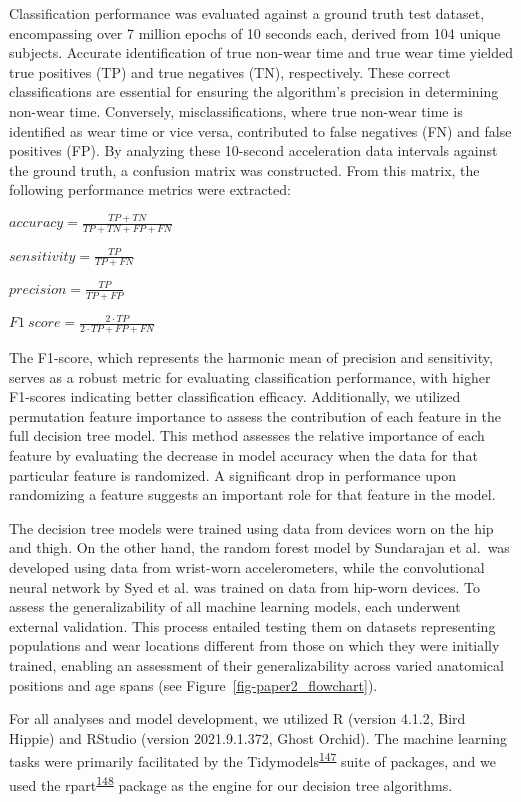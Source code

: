 \documentclass[
  10pt,
]{scrbook}
\begin{document}
Classification performance was evaluated against a ground truth test
dataset, encompassing over 7 million epochs of 10 seconds each, derived
from 104 unique subjects. Accurate identification of true non-wear time
and true wear time yielded true positives (TP) and true negatives (TN),
respectively. These correct classifications are essential for ensuring
the algorithm's precision in determining non-wear time. Conversely,
misclassifications, where true non-wear time is identified as wear time
or vice versa, contributed to false negatives (FN) and false positives
(FP). By analyzing these 10-second acceleration data intervals against
the ground truth, a confusion matrix was constructed. From this matrix,
the following performance metrics were extracted:

\hfill\break
\(accuracy=\frac{TP+TN}{TP+TN+FP+FN}\)

\hfill\break
\(sensitivity=\frac{TP}{TP+FN}​\)

\hfill\break
\(precision=\frac{TP}{TP+FP}\)

\hfill\break
\(​F1\ score=\frac{2 \cdot TP}{2 \cdot TP+FP+FN}​\)

The F1-score, which represents the harmonic mean of precision and
sensitivity, serves as a robust metric for evaluating classification
performance, with higher F1-scores indicating better classification
efficacy. Additionally, we utilized permutation feature importance to
assess the contribution of each feature in the full decision tree model.
This method assesses the relative importance of each feature by
evaluating the decrease in model accuracy when the data for that
particular feature is randomized. A significant drop in performance upon
randomizing a feature suggests an important role for that feature in the
model.

The decision tree models were trained using data from devices worn on
the hip and thigh. On the other hand, the random forest model by
Sundarajan et al.~was developed using data from wrist-worn
accelerometers, while the convolutional neural network by Syed et al.
was trained on data from hip-worn devices. To assess the
generalizability of all machine learning models, each underwent external
validation. This process entailed testing them on datasets representing
populations and wear locations different from those on which they were
initially trained, enabling an assessment of their generalizability
across varied anatomical positions and age spans (see
Figure~\ref{fig-paper2_flowchart}).

For all analyses and model development, we utilized R (version 4.1.2,
Bird Hippie) and RStudio (version 2021.9.1.372, Ghost Orchid). The
machine learning tasks were primarily facilitated by the
Tidymodels\textsuperscript{\protect\hyperlink{ref-kuhn_tidymodels_2020}{147}}
suite of packages, and we used the
rpart\textsuperscript{\protect\hyperlink{ref-rpart}{148}} package as the
engine for our decision tree algorithms.
\end{document}
